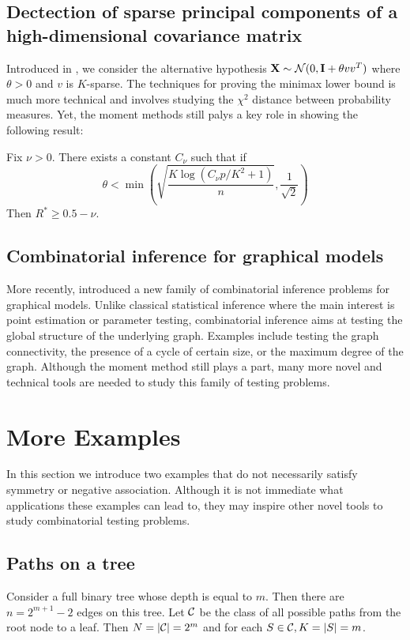 \documentclass[10pt, oneside]{article}
\begin{document}
\subsection{Dectection of sparse principal components of a high-dimensional covariance matrix}
Introduced in \cite{berthet2013optimal}, we consider the alternative hypothesis $\mathbf{X} \sim {\mathcal N}(0, \mathbf{I} + \theta v v^T)$ where $\theta >0$ and $v$ is $K$-sparse. The techniques for proving the minimax lower bound is much more technical and involves studying the $\chi^2$ distance between probability measures. Yet, the moment methods still palys a key role in showing the following result:
\begin{prop}
  Fix $\nu > 0$. There exists a constant $C_{\nu}$ such that if 
  $$\theta < \min(\sqrt{\frac{K \log(C_{\nu}p/K^2 + 1)}{n}}, \frac{1}{\sqrt{2}})$$
  Then
  $R^* \ge 0.5 - \nu$.
\end{prop}

\subsection{Combinatorial inference for graphical models}

More recently, \cite{neykov2019combinatorial} introduced a new family of combinatorial inference problems for graphical models. Unlike classical statistical inference where the main interest is point estimation or parameter testing, combinatorial inference aims at testing the global structure of the underlying graph. Examples include testing the graph connectivity, the presence of a cycle of certain size, or the maximum degree of the graph. Although the moment method still plays a part, many more novel and technical tools are needed to study this family of testing problems.

\section{More Examples}

In this section we introduce two examples that do not necessarily satisfy symmetry or negative association. Although it is not immediate what applications these examples can lead to, they may inspire other novel tools to study combinatorial testing problems.

\subsection{Paths on a tree}
Consider a full binary tree whose depth is equal to $m$. Then there are $n = 2^{m+1} - 2$ edges on this tree. Let ${\mathcal C}$ be the class of all possible paths from the root node to a leaf. Then $N = |{\mathcal C}| = 2^m$ and for each $S \in {\mathcal C}, K = |S| = m$. 
\end{document}
